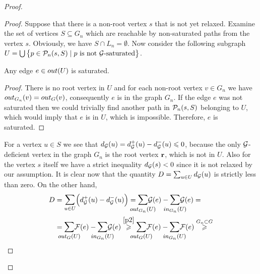 \documentclass[12pt]{amsart}
\begin{document}
\begin{proof}
\begin{proof}
          Suppose that there is a non-root vertex $s$ that is not yet relaxed.
          Examine the set of vertices $S \subseteq G_n$ which are reachable by non-saturated paths from the vertex $s$.
          Obviously, we have $S \cap L_n = \emptyset$.
          Now consider the following subgraph $U = \bigcup\big\{p \in \gnpaths(s, S) \mid \text{$p$ is not $\cal{G}$-saturated}\big\}$.
          \begin{lemma}
            Any edge $e \in \eout(U)$ is saturated.
          \end{lemma}
          \begin{proof}
            There is no root vertex in $U$ and for each non-root vertex $v \in G_n$ we have
            $\eout_{G_n}(v) = \eout_G(v)$, consequently $e$ is in the graph $G_n$.
            If the edge $e$ was not saturated then we could trivially find another path in $\gnpaths(s, S)$ belonging to $U$, which would imply that
              $e$ is in $U$, which is impossible.
            Therefore, $e$ is saturated.
          \end{proof}
          For a vertex $u \in S$ we see that $d_{\cal{G}}(u) = d^{+}_{\cal{G}}(u) - d^{-}_{\cal{G}}(u) \leq 0$, because
            the only $\cal{G}$-deficient vertex in the graph $G_n$ is the root vertex $\root$, which is not in $U$.
          Also for the vertex $s$ itself we have a strict inequality $d_{\cal{G}}(s) < 0$ since it is not relaxed by our assumption.
          It is clear now that the quantity $D = \sum_{u \in U} d_{\cal{G}}(u)$ is strictly less than zero.
          On the other hand,
          \[
          \begin{split}
            D &= \mathlarger\sum_{u \in U} \Big(d^{+}_{\cal{G}}(u) - d^{-}_{\cal{G}}(u)\Big)
            = \mathlarger{\smashoperator{\sum_{\eout_{G_n}(U)}}} \cal{G}(e) - \mathlarger{\smashoperator{\sum_{\ein_{G_n}(U)}}} \cal{G}(e) = \\
            &= \mathlarger{\smashoperator{\sum_{\eout_{G}(U)}}} \flowpos(e) - \mathlarger{\smashoperator{\sum_{\ein_{G_n}(U)}}} \cal{G}(e)
              \overset{\ref{p2}}{\geq} \mathlarger{\smashoperator{\sum_{\eout_G(U)}}} \flowpos(e) - \mathlarger{\smashoperator{\sum_{\ein_{G_n}(U)}}} \flowpos(e) 
              \overset{G_n \subset G} \geq \\

\end{split}\]
\end{proof}
\end{proof}
\end{document}
